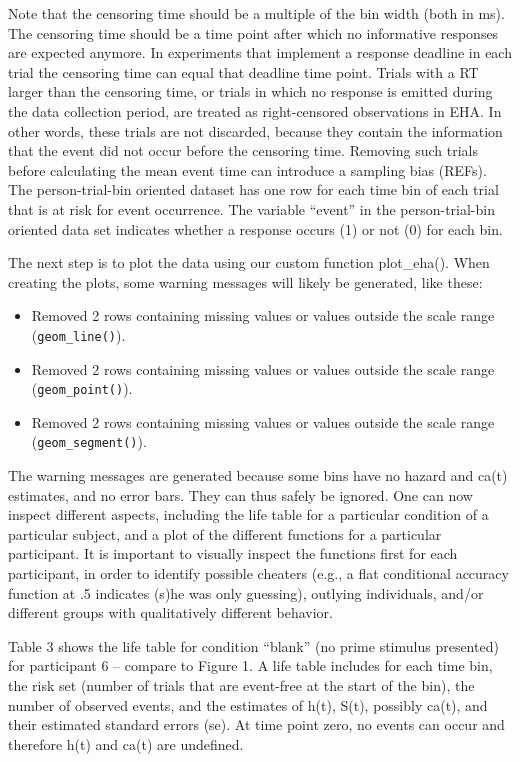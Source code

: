 \documentclass[
  man,floatsintext]{apa6}
\providecommand{\tightlist}{%
  \setlength{\itemsep}{0pt}\setlength{\parskip}{0pt}}
\begin{document}
Note that the censoring time should be a multiple of the bin width (both in ms). The censoring time should be a time point after which no informative responses are expected anymore. In experiments that implement a response deadline in each trial the censoring time can equal that deadline time point. Trials with a RT larger than the censoring time, or trials in which no response is emitted during the data collection period, are treated as right-censored observations in EHA. In other words, these trials are not discarded, because they contain the information that the event did not occur before the censoring time. Removing such trials before calculating the mean event time can introduce a sampling bias (REFs). The person-trial-bin oriented dataset has one row for each time bin of each trial that is at risk for event occurrence. The variable ``event'' in the person-trial-bin oriented data set indicates whether a response occurs (1) or not (0) for each bin.

The next step is to plot the data using our custom function plot\_eha(). When creating the plots, some warning messages will likely be generated, like these:

\begin{itemize}
\tightlist
\item
  Removed 2 rows containing missing values or values outside the scale range (\texttt{geom\_line()}).
\item
  Removed 2 rows containing missing values or values outside the scale range (\texttt{geom\_point()}).
\item
  Removed 2 rows containing missing values or values outside the scale range (\texttt{geom\_segment()}).
\end{itemize}

The warning messages are generated because some bins have no hazard and ca(t) estimates, and no error bars. They can thus safely be ignored.
One can now inspect different aspects, including the life table for a particular condition of a particular subject, and a plot of the different functions for a particular participant. It is important to visually inspect the functions first for each participant, in order to identify possible cheaters (e.g., a flat conditional accuracy function at .5 indicates (s)he was only guessing), outlying individuals, and/or different groups with qualitatively different behavior.

Table 3 shows the life table for condition ``blank'' (no prime stimulus presented) for participant 6 -- compare to Figure 1. A life table includes for each time bin, the risk set (number of trials that are event-free at the start of the bin), the number of observed events, and the estimates of h(t), S(t), possibly ca(t), and their estimated standard errors (se). At time point zero, no events can occur and therefore h(t) and ca(t) are undefined.
\end{document}
